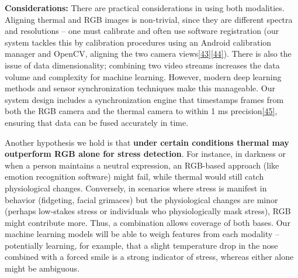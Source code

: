 \documentclass[12pt,a4paper]{article}
\begin{document}
\textbf{Considerations:} There are practical considerations in using both modalities. Aligning thermal and RGB images is non-trivial, since they are different spectra and resolutions -- one must calibrate and often use software registration (our system tackles this by calibration procedures using an Android calibration manager and OpenCV, aligning the two camera views\href{https://github.com/buccancs/bucika_gsr/blob/7048f7f6a7536f5cd577ed2184800d3dad97fd08/docs/architecture.md\#L48-L56}{{[}43{]}}\href{https://github.com/buccancs/bucika_gsr/blob/7048f7f6a7536f5cd577ed2184800d3dad97fd08/docs/architecture.md\#L118-L125}{{[}44{]}}). There is also the issue of data dimensionality; combining two video streams increases the data volume and complexity for machine learning. However, modern deep learning methods and sensor synchronization techniques make this manageable. Our system design includes a synchronization engine that timestamps frames from both the RGB camera and the thermal camera to within 1 ms precision\href{https://github.com/buccancs/bucika_gsr/blob/7048f7f6a7536f5cd577ed2184800d3dad97fd08/docs/architecture.md\#L179-L184}{{[}45{]}}, ensuring that data can be fused accurately in time.

Another hypothesis we hold is that \textbf{under certain conditions thermal may outperform RGB alone for stress detection}. For instance, in darkness or when a person maintains a neutral expression, an RGB-based approach (like emotion recognition software) might fail, while thermal would still catch physiological changes. Conversely, in scenarios where stress is manifest in behavior (fidgeting, facial grimaces) but the physiological changes are minor (perhaps low-stakes stress or individuals who physiologically mask stress), RGB might contribute more. Thus, a combination allows coverage of both bases. Our machine learning models will be able to weigh features from each modality -- potentially learning, for example, that a slight temperature drop in the nose combined with a forced smile is a strong indicator of stress, whereas either alone might be ambiguous.
\end{document}

